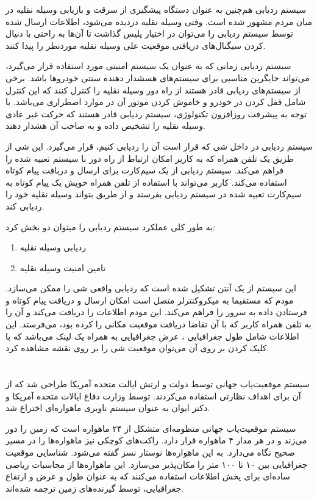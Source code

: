  
 سیستم ردیابی هم‌چنین به عنوان دستگاه پیشگیری از سرقت و بازیابی وسیله نقلیه در میان مردم مشهور شده است. وقتی وسیله نقلیه دزدیده می‌شود، اطلاعات ارسال شده توسط سیستم ردیابی را می‌توان در اختیار پلیس گذاشت تا آن‌ها به راحتی با دنیال کردن سیگنال‌های دریافتی موقعیت علی وسیله نقلیه موردنظر را پیدا کنند.
 
 
 سیستم ردیابی زمانی که به عنوان یک سیستم امنیتی مورد استفاده قرار می‌گیرد، می‌تواند حایگرین مناسبی برای سیستم‌های هسشدار دهنده سنتی خودروها باشد. برخی از سیستم‌های ردیابی قادر هستند از راه دور وسیله نقلیه را کنترل کنند که این کنترل شامل قفل کردن در خودرو و خاموش کردن موتور آن در موارد اضطراری می‌باشد. با توجه به پیشرفت روزافزون تکنولوژی، سیستم ردیابی قادر هستند که حرکت غیر عادی وسیله نقلیه را تشخیص داده و به صاحب آن هشدار دهند.
 
  
  سیستم ردیابی در داخل شی که قرار است آن را ردیابی کنیم، قرار می‌گیرد. این شی از طزیق یک تلفن همراه که به کاربر امکان ارتباط از راه دور با سیستم تعبیه شده را فراهم می‌کند. سیستم ردیابی از یک سیم‌کارت برای ارسال و دربافت پیام کوتاه استفاده می‌کند. کاربر می‌تواند با استفاده از تلفن همراه خویش یک پیام کوتاه به سیم‌کارت تعبیه شده در سیستم ردیابی بفرستد و از طریق بتواند وسیله نقلیه خود را ردیابی کند.
  
  
  به طور کلی عملکرد سیستم ردیابی را میتوان دو بخش کرد:
  \begin{enumerate}
  	\item ردیابی وسیله نقلیه
	\item تامین امنیت وسیله نقلیه
  \end{enumerate}
این سیستم از یک آنتن  تشکیل شده است که ردیابی واقعی شی را ممکن می‌سازد. مودم  که مستقیما به میکروکنترلر متصل است امکان ارسال و دریافت پیام کوتاه و فرستادن داده به سرور را فراهم می‌کند. این مودم اطلاعات را دریافت می‌کند و آن را به تلفن همراه کاربر که با آن تقاضا دریافت موقعیت مکانی را کرده بود، می‌فرستد. این اطلاعات شامل طول جغرافیایی ، عرض جغرافیایی  به همراه یک لینک می‌باشد که با کلیک کردن بر روی آن می‌توان موقعیت شی را بر روی نقشه مشاهده کرد.
\section{}
سیستم موقعیت‌‌یاب جهانی توسط دولت و ارتش ایالت متحده آمریکا طراحی شد که از آن برای اهداف نظارتی استفاده می‌کردند.  توسط وزارت دفاع ایالات متحده آمریکا و دکتر ایوان  به عنوان سیستم ناوبری ماهواره‌‌ای اختراع شد.


سیستم موقعیت‌یاب جهانی منظومه‌ای متشکل از ۲۴ ماهواره است که زمین را دور می‌زند و در هر مدار ۴ ماهواره قرار دارد. راکت‌های کوچکی نیز ماهواره‌ها را در مسیر صحیح نگاه می‌دارد. به این ماهواره‌ها نوستار نسز گفته می‌شود.
شناسایی موقعیت جغرافیایی بین ۱۰ تا ۱۰۰ متر را مکان‌پذیر می‌سازد. این ماهواره‌ها از محاسبات ریاضی ساده‌ای برای پخش اطلاعات استفاده می‌کنند که به عنوان طول و عرض و ارتفاع جغرافیایی، توسط گیرنده‌های زمین ترجمه شده‌اند.


